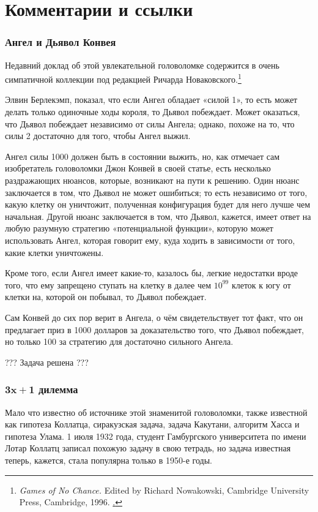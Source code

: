\section*{Комментарии и ссылки}

\subsubsection*{Ангел и Дьявол Конвея}

Недавний доклад об этой увлекательной головоломке содержится в очень симпатичной коллекции под редакцией Ричарда Новаковского.\footnote{\emph{Games of No Chance.} Edited by Richard Nowakowski, Cambridge University Press, Cambridge, 1996. \href{http://library.msri.org/books/Book29/}.} 

Элвин Берлекэмп,  показал, что если Ангел обладает «силой 1», то есть может делать только одиночные ходы короля, то Дьявол побеждает.
Может оказаться, что Дьявол побеждает независимо от силы Ангела; 
однако, похоже на то, что силы 2 достаточно для того, чтобы Ангел выжил.

Ангел силы 1000 должен быть в состоянии выжить, но, как отмечает сам изобретатель головоломки Джон Конвей в своей статье, есть несколько раздражающих нюансов, которые, возникают на пути к решению.
Один нюанс заключается в том, что Дьявол не может ошибиться;
то есть независимо от того, какую клетку он уничтожит, полученная конфигурация будет для него лучше чем начальная.
Другой нюанс заключается в том, что Дьявол, кажется, имеет ответ на любую разумную стратегию «потенциальной функции», которую может использовать Ангел, которая говорит ему, куда ходить в зависимости от того, какие клетки уничтожены. %

Кроме того, если Ангел имеет какие-то, казалось бы, легкие недостатки вроде того, что ему запрещено ступать на клетку в далее чем $10^{99}$ клеток к югу от клетки на, которой он побывал, то Дьявол побеждает.

Сам Конвей до сих пор верит в Ангела, о чём свидетельствует тот факт, что он предлагает приз в 1000 долларов за доказательство того, что Дьявол побеждает, но только 100 за стратегию для достаточно сильного Ангела.

??? Задача решена ???

\subsubsection*{$\bm{3x+1}$ дилемма}

Мало что известно об источнике этой знаменитой головоломки, также известной как гипотеза Коллатца, сиракузская задача, задача Какутани, алгоритм Хасса и гипотеза Улама.
1 июля 1932 года, студент Гамбургского университета по имени Лотар Коллатц записал похожую задачу в свою тетрадь, но задача известная теперь, кажется, стала популярна только в 1950-е годы.

